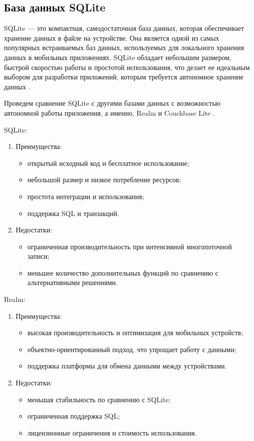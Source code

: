 \subsection{База данных SQLite}
SQLite — это компактная, самодостаточная база данных, которая обеспечивает хранение данных в файле на устройстве. Она является одной из самых популярных встраиваемых баз данных, используемых для локального хранения данных в мобильных приложениях. SQLite обладает небольшим размером, быстрой скоростью работы и простотой использования, что делает ее идеальным выбором для разработки приложений, которым требуется автономное хранение данных \cite{SQLite}. 

Проведем сравнение SQLite с другими базами данных с возможностью автономной работы приложения, а именно, Realm \cite{Realm} и Couchbase Lite \cite{Couchbase}.

SQLite:
\begin{enumerate}
    \item Преимущества:
    \begin{itemize}
        \item открытый исходный код и бесплатное использование;
        \item небольшой размер и низкое потребление ресурсов;
        \item простота интеграции и использования;
        \item поддержка SQL и транзакций.
    \end{itemize}
    \item Недостатки:
    \begin{itemize}
        \item ограниченная производительность при интенсивной многопоточной записи;
        \item меньшее количество дополнительных функций по сравнению с альтернативными решениями.
    \end{itemize}
\end{enumerate}

Realm:
\begin{enumerate}
    \item Преимущества:
    \begin{itemize}
        \item высокая производительность и оптимизация для мобильных устройств;
        \item объектно-ориентированный подход, что упрощает работу с данными;
        \item поддержка платформы для обмена данными между устройствами.
    \end{itemize}
    \item Недостатки:
    \begin{itemize}
        \item меньшая стабильность по сравнению с SQLite;
        \item ограниченная поддержка SQL;
        \item лицензионные ограничения и стоимость использования.
    \end{itemize}
\end{enumerate}

